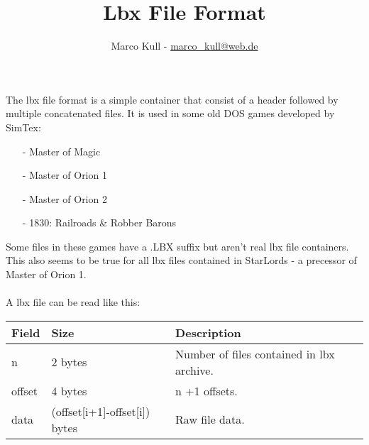 \documentclass[a4paper]{scrartcl}
\begin{document}
\title{Lbx File Format}
\author{Marco Kull - \href{mailto:marco_kull@web.de}{marco\_kull@web.de}}\date{}
\maketitle
\thispagestyle{empty}

The lbx file format is a simple container that consist of a header followed by multiple concatenated files. It is used in some old DOS games developed by SimTex:
\begin{itemize}
\item[-] Master of Magic
\item[-] Master of Orion 1
\item[-] Master of Orion 2
\item[-] 1830: Railroads \& Robber Barons
\end{itemize}

Some files in these games have a .LBX suffix but aren't real lbx file containers. This also seems to be true for all lbx files contained in StarLords - a precessor of Master of Orion 1.\\\\
A lbx file can be read like this:
\begin{flushleft}
\begin{tabular}{|l|l|l|l|}
\hline
\textbf{Field} & \textbf{Size} & \textbf{Description}\\ 
\hline \hline
n & 2 bytes & Number of files contained in lbx archive.\\\hline
offset & 4 bytes & n +1 offsets.\\\hline
data & (offset[i+1]-offset[i]) bytes & Raw file data.\\\hline
\end{tabular}
\end{flushleft}
\end{document}
